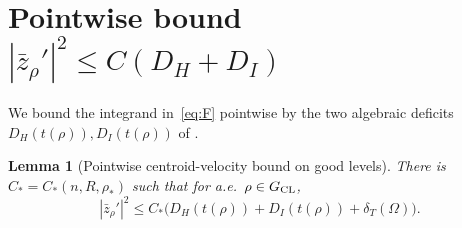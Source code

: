 \documentclass[11pt]{article}
\newtheorem{lemma}[theorem]{Lemma}
\theoremstyle{definition}
\newcommand{\Om}{\Omega}
\newcommand{\rstar}{\rho_{*}}
\begin{document}
\section{Pointwise bound $|\bar z_\rho'|^{2}\le C(D_H+D_I)$}\label{sec:pointwise}

We bound the integrand in~\eqref{eq:F} pointwise by the two algebraic
deficits $D_H(t(\rho)),D_I(t(\rho))$ of \cite{LevelSetIdentity}.

\begin{lemma}[Pointwise centroid-velocity bound on good levels]\label{lem:4.1}
There is $C_*=C_*(n,R,\rstar)$ such that for a.e.\ $\rho\in G_{\rm CL}$,
\begin{equation}\label{eq:4.1}
   |\bar z_\rho'|^{2}\le C_*\bigl(D_H(t(\rho))+D_I(t(\rho))+\delta_T(\Om)\bigr).
\end{equation}
\end{lemma}
\end{document}

